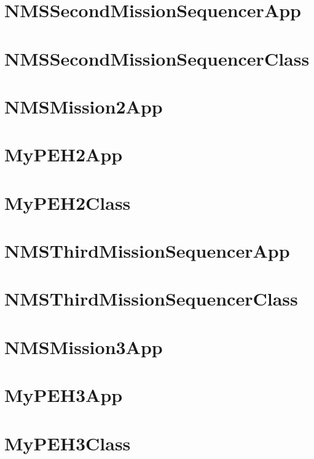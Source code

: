 \documentclass{article}
\begin{document}
\section{NMSSecondMissionSequencerApp}

\newpage

\section{NMSSecondMissionSequencerClass}

\newpage

\section{NMSMission2App}

\newpage

\section{MyPEH2App}

\newpage

\section{MyPEH2Class}

\newpage

\section{NMSThirdMissionSequencerApp}

\newpage

\section{NMSThirdMissionSequencerClass}

\newpage

\section{NMSMission3App}

\newpage

\section{MyPEH3App}

\newpage

\section{MyPEH3Class}

\newpage
\end{document}
